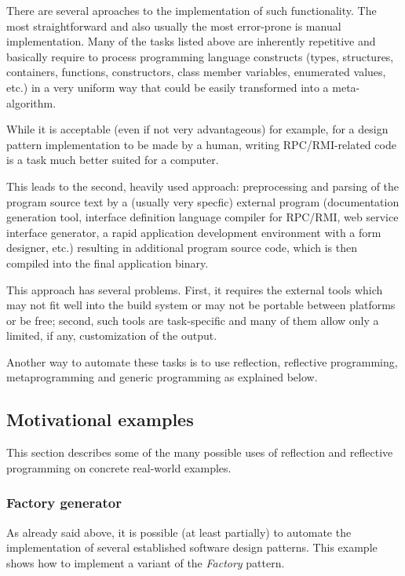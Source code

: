 There are several aproaches to the implementation of such
functionality. The most straightforward and also usually the most
error-prone is manual implementation. Many of the tasks listed above
are inherently repetitive and basically require to process programming
language constructs (types, structures, containers, functions, constructors,
class member variables, enumerated values, etc.)
in a very uniform way that could be easily transformed into a meta-algorithm.

While it is acceptable (even if not very advantageous)
for example, for a design pattern implementation to be made by a human,
writing RPC/RMI-related code is a task much better suited for a computer.

This leads to the second, heavily used approach: preprocessing
and parsing of the program source text by a (usually very specfic) external
program (documentation generation tool, interface definition language compiler
for RPC/RMI, web service interface generator, a rapid application
development environment with a form designer, etc.) resulting in additional
program source code, which is then compiled into the final application binary.

This approach has several problems. First, it requires the external
tools which may not fit well into the build system or may not be portable
between platforms or be free; second, such tools are task-specific
and many of them allow only a limited, if any, customization of the output.

Another way to automate these tasks is to use reflection,
reflective programming, metaprogramming and generic programming as
explained below.

\subsection{Motivational examples}

This section describes some of the many possible uses of reflection
and reflective programming on concrete real-world examples.

\subsubsection{Factory generator}

As already said above, it is possible (at least partially) to automate 
the implementation of several established software design patterns.
This example shows how to implement a variant of the {\em Factory}
pattern.

